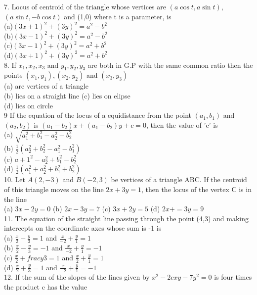\documentclass[12pt]{article}
\begin{document}
7. Locus of centroid of the triangle whose vertices are $(a\cos t, a\sin t)$, $(a\sin t,-b\cos t)$ and (1,0) where t is a parameter, is \\
(a)$(3x+1)^2+(3y)^2=a^2-b^2$\\
(b)$(3x-1)^2+(3y)^2=a^2-b^2$\\
(c)$(3x-1)^2+(3y)^2=a^2+b^2$\\
(d)$(3x+1)^2+(3y)^2=a^2+b^2$\\
8. If $x_1,x_2,x_3$ and $y_1,y_2,y_3$ are both in G.P with the same common ratio then the points $(x_1,y_1),(x_2,y_2)$ and $(x_3,y_3)$\\
(a) are vertices of a triangle\\
(b) lies on a straight line
(c) lies on elipse\\
(d) lies on circle\\
9 If the equation of the locus of a equidistance from the point $(a_1,b_1)$ and $(a_2,b_2)$ is $(a_1-b_2)x+(a_1-b_2)y+c=0$, then the value of 'c' is\\
(a) $\sqrt{a_1^2+b_1^2-a_2^2-b_2^2}$\\
(b) $\frac{1}{2}(a_2^2+b_2^2-a_1^2-b_1^2)$\\
(c) $a+1^2-a_2^2+b_1^2-b_2^2$\\
(d) $\frac{1}{2}(a_1^2+a_2^2+b_1^2+b_2^2)$\\
10. Let $A(2,-3)$ and $B(-2,3)$ be vertices of a triangle ABC. If the centroid of this triangle moves on the line $2x+3y=1$, then the locus of the vertex C is in the line \\
(a) $3x-2y=0$ \hspace{1cm} (b) $2x-3y=7$ \hspace{1cm} (c) $3x+2y=5$ \hspace{1cm} (d) $2x+=3y=9$\\
11. The equation of the straight line passing through the point (4,3) and making intercepts on the coordinate axes whose sum is -1 is \\
(a) $\frac{x}{2}-\frac{y}{3}=1$ and $\frac{x}{-2}+\frac{y}{1}=1$\\
(b) $\frac{x}{2}-\frac{y}{3}=-1$ and $\frac{x}{-2}+\frac{y}{1}=-1$\\
(c) $\frac{x}{2}+frac{y}{3}=1$ and $\frac{x}{2}+\frac{y}{1}=1$\\
(d) $\frac{x}{2}+\frac{y}{3}=1$ and $\frac{x}{-2}+\frac{y}{1}=-1$\\
12. If the sum of the slopes of the lines given by $x^2-2cxy-7y^2=0$ is four times the product c has the value\\
\end{document}
